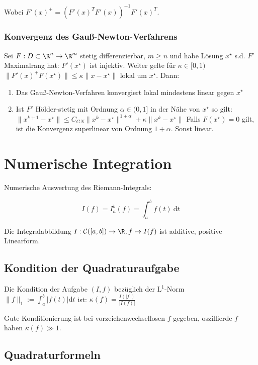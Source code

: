 Wobei $F'(x)^+ = (F'(x)^T F'(x))^{-1} F'(x)^T$.

\subsubsection*{Konvergenz des Gauß-Newton-Verfahrens}

Sei $F : D \subset \R^n \to \R^m$ stetig differenzierbar, $m \geq n$ und habe Lösung $x^\star$ s.d. $F'$ Maximalrang hat: $F'(x^\star)$ ist injektiv. Weiter gelte für $\kappa \in [0,1)$ $\|F'(x)^+ F(x^\star)\| \leq \kappa \|x-x^\star\|$ lokal um $x^\star$. Dann:

\begin{enumerate}[label=(\alph*)]
	\item Das Gauß-Newton-Verfahren konvergiert lokal mindestens linear gegen $x^\star$
	\item Ist $F'$ Hölder-stetig mit Ordnung $\alpha \in (0,1]$ in der Nähe von $x^\star$ so gilt: \\ $\|x^{k+1}-x^\star\| \leq C_{GN}\|x^k-x^\star\|^{1+\alpha} + \kappa\|x^k-x^\star\|$ Falls $F(x^\star) = 0$ gilt, ist die Konvergenz superlinear von Ordnung $1+\alpha$. Sonst linear.
\end{enumerate}

\section*{Numerische Integration}

Numerische Auswertung des Riemann-Integrals:

\vspace*{-2mm}
$$I(f) = I_a^b(f) = \int_a^b f(t) \ \text{d}t$$

Die Integralabbildung $I : \mathcal{C}([a,b]) \to \R, f \mapsto I(f)$ ist additive, positive Linearform.

\subsection*{Kondition der Quadraturaufgabe}

Die Kondition der Aufgabe $(I,f)$ bezüglich der $\text{L}^1$-Norm $\|f\|_1 := \int_a^b |f(t)| \text{d}t$ ist: $\kappa(f) = \frac{I(|f|)}{|I(f)|}$

Gute Konditionierung ist bei vorzeichenwechsellosen $f$ gegeben, oszillierde $f$ haben $\kappa(f) \gg 1$.

\subsection*{Quadraturformeln}

